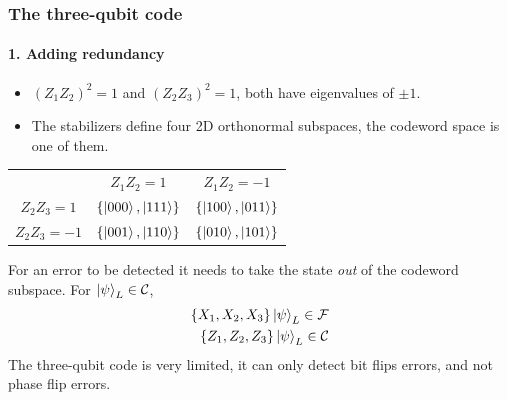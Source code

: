 \documentclass{beamer}
\newcommand{\mc}{\mathcal}
\renewcommand{\(}{\left(}
\renewcommand{\)}{\right)}
\renewcommand{\[}{\left[}
\renewcommand{\]}{\right]}
\begin{document}
\begin{frame}
    \frametitle{The three-qubit code}
    \framesubtitle{1. Adding redundancy}
    \begin{itemize}
        \item $(Z_1Z_2)^2 = 1$ and $(Z_2Z_3)^2 = 1$, both have eigenvalues of $\pm 1$.
        \item The stabilizers define four 2D orthonormal subspaces, the codeword space is one of them.  
    \end{itemize}
    \begin{table}
        \begin{tabular}{ |c c c| }
            \hline
                            & $Z_1Z_2= 1$ & $Z_1Z_2= -1$ \\ 
            $Z_2Z_3= 1$     & $\{\ket{000},\ket{111}\}$ &$\{\ket{100},\ket{011}\}$ \\ 
            $Z_2Z_3= -1$     & $\{\ket{001},\ket{110}\}$ &$\{\ket{010},\ket{101}\}$ \\
            \hline
        \end{tabular}
    \end{table}
    \pause
    For an error to be detected it needs to take the state \emph{out} of the codeword subspace. For $\ket{\psi}_L \in \mc C$,
    \begin{align*}
        \{X_1, X_2, X_3\} \ket{\psi}_L \in \mc F \\
        \{Z_1, Z_2, Z_3\} \ket{\psi}_L \in \mc C 
    \end{align*}
    The three-qubit code is very limited, it can only detect bit flips errors, and not phase flip errors.
\end{frame}
\end{document}

